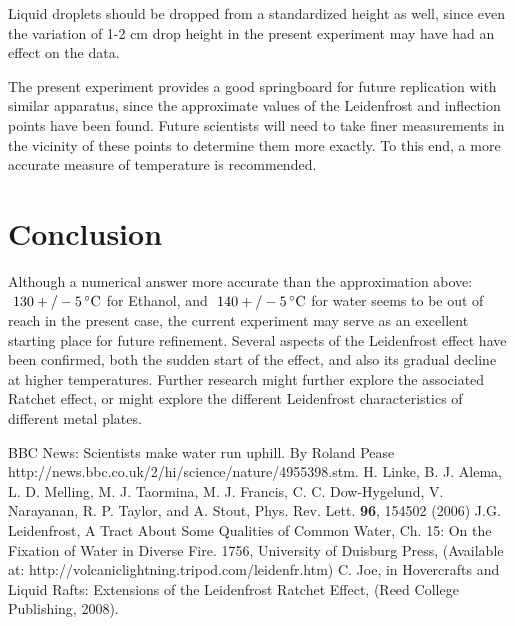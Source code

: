 \documentclass[aps,pre,twocolumn,nofootinbib]{revtex4}
\begin{document}
Liquid droplets should be dropped from a standardized height as well, since even the variation of 1-2 cm drop height in the present experiment may have had an effect on the data.  

The present experiment provides a good springboard for future replication with similar apparatus, since the approximate values of the Leidenfrost and inflection points have been found.  Future scientists will need to take finer measurements in the vicinity of  these points to determine them more exactly.  To this end, a more accurate measure of temperature is recommended.  

\section{Conclusion}

Although a numerical answer more accurate than the approximation above: $~130 +/- 5\,^{\circ}{\rm C}$ for Ethanol, and $~140 +/- 5\,^{\circ}{\rm C}$ for water seems to be out of reach in the present case, the current experiment may serve as an excellent starting place for future refinement.  Several aspects of the Leidenfrost effect have been confirmed, both the sudden start of the effect, and also its gradual decline at higher temperatures.  Further research might further explore the associated Ratchet effect, or might explore the different Leidenfrost characteristics of different metal plates.  

	\begin{thebibliography}{99}
 BBC News: Scientists make water run uphill.  By Roland Pease http://news.bbc.co.uk/2/hi/science/nature/4955398.stm.
 H. Linke, B. J. Alema, L. D. Melling, M. J. Taormina, M. J. Francis, C. C. Dow-Hygelund, V. Narayanan, R. P. Taylor, and A. Stout, Phys. Rev. Lett.  \textbf{96}, 154502 (2006) 
 J.G. Leidenfrost, A Tract About Some Qualities of Common Water, Ch. 15: On the Fixation of Water in Diverse Fire.  1756, University of Duisburg Press, (Available at: http://volcaniclightning.tripod.com/leidenfr.htm)
 C. Joe, in Hovercrafts and Liquid Rafts: Extensions of the Leidenfrost Ratchet Effect, (Reed College Publishing, 2008).
	\end{thebibliography}
\end{document}
